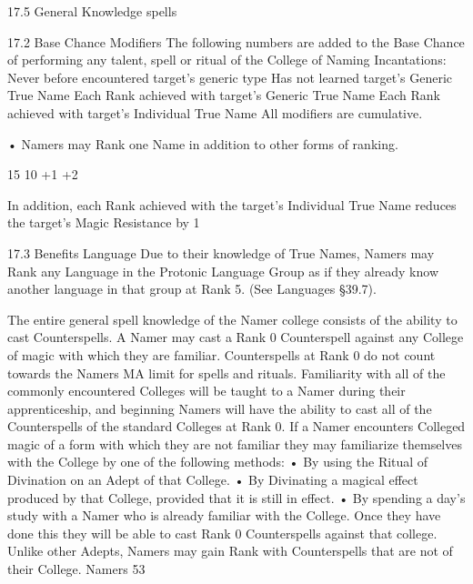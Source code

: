 \documentclass[a4paper]{article}
\begin{document}
\begin{multicols}{3}
17.5 General Knowledge spells

17.2 Base Chance Modifiers
The following numbers are added to the Base
Chance of performing any talent, spell or ritual of
the College of Naming Incantations:
Never before encountered target’s generic
type
Has not learned target’s Generic True
Name
Each Rank achieved with target’s Generic
True Name
Each Rank achieved with target’s Individual True Name
All modifiers are cumulative.

• Namers may Rank one Name in addition to other
forms of ranking.

15%
10%
+1%
+2%

In addition, each Rank achieved with the target’s
Individual True Name reduces the target’s Magic
Resistance by 1%

17.3 Benefits
Language
Due to their knowledge of True Names, Namers
may Rank any Language in the Protonic Language
Group as if they already know another language in
that group at Rank 5. (See Languages §39.7).

The entire general spell knowledge of the Namer
college consists of the ability to cast Counterspells.
A Namer may cast a Rank 0 Counterspell against
any College of magic with which they are familiar.
Counterspells at Rank 0 do not count towards the
Namers MA limit for spells and rituals.
Familiarity with all of the commonly encountered
Colleges will be taught to a Namer during their
apprenticeship, and beginning Namers will have
the ability to cast all of the Counterspells of the
standard Colleges at Rank 0. If a Namer encounters
Colleged magic of a form with which they are not
familiar they may familiarize themselves with the
College by one of the following methods:
• By using the Ritual of Divination on an Adept of
that College.
• By Divinating a magical effect produced by that
College, provided that it is still in effect.
• By spending a day’s study with a Namer who is
already familiar with the College.
Once they have done this they will be able to cast
Rank 0 Counterspells against that college.
Unlike other Adepts, Namers may gain Rank with
Counterspells that are not of their College. Namers
53


\end{multicols}
\end{document}
